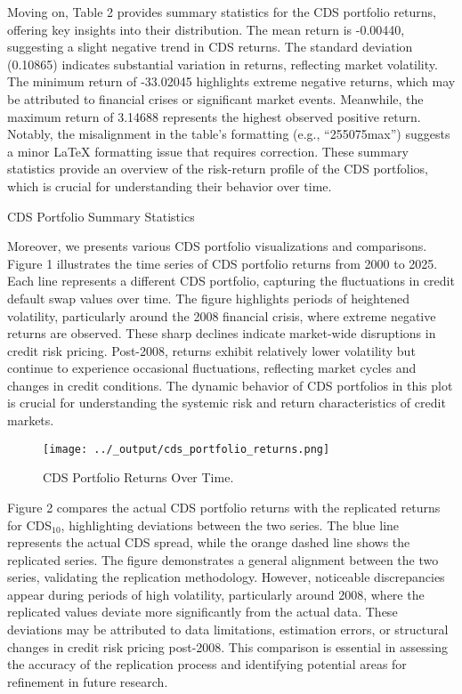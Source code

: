 \documentclass{article}
\begin{document}
Moving on, Table 2 provides summary statistics for the CDS portfolio returns, offering key insights into their distribution. The mean return is -0.00440, suggesting a slight negative trend in CDS returns. The standard deviation (0.10865) indicates substantial variation in returns, reflecting market volatility. The minimum return of -33.02045 highlights extreme negative returns, which may be attributed to financial crises or significant market events. Meanwhile, the maximum return of 3.14688 represents the highest observed positive return. Notably, the misalignment in the table’s formatting (e.g., ``255075max'') suggests a minor LaTeX formatting issue that requires correction. These summary statistics provide an overview of the risk-return profile of the CDS portfolios, which is crucial for understanding their behavior over time.
\begin{table}[H]
    \centering
    \caption{CDS Portfolio Summary Statistics}
    \label{tab:cds_summary}
\end{table}

Moreover, we presents various CDS portfolio visualizations and comparisons. \\

Figure 1 illustrates the time series of CDS portfolio returns from 2000 to 2025. Each line represents a different CDS portfolio, capturing the fluctuations in credit default swap values over time. The figure highlights periods of heightened volatility, particularly around the 2008 financial crisis, where extreme negative returns are observed. These sharp declines indicate market-wide disruptions in credit risk pricing. Post-2008, returns exhibit relatively lower volatility but continue to experience occasional fluctuations, reflecting market cycles and changes in credit conditions. The dynamic behavior of CDS portfolios in this plot is crucial for understanding the systemic risk and return characteristics of credit markets. 

\begin{figure}[H]
    \centering
    \texttt{[image: ../\_output/cds\_portfolio\_returns.png]}  %
    \caption{\label{fig:cds_portfolio_returns}CDS Portfolio Returns Over Time.}
\end{figure}

Figure 2 compares the actual CDS portfolio returns with the replicated returns for CDS$_{10}$, highlighting deviations between the two series. The blue line represents the actual CDS spread, while the orange dashed line shows the replicated series. The figure demonstrates a general alignment between the two series, validating the replication methodology. However, noticeable discrepancies appear during periods of high volatility, particularly around 2008, where the replicated values deviate more significantly from the actual data. These deviations may be attributed to data limitations, estimation errors, or structural changes in credit risk pricing post-2008. This comparison is essential in assessing the accuracy of the replication process and identifying potential areas for refinement in future research.
\end{document}
